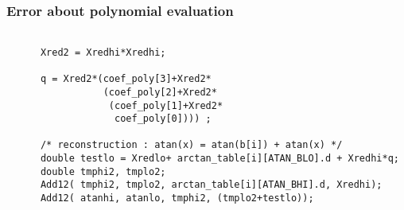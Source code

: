 \subsubsection{Error about polynomial evaluation}
\begin{lstlisting}[caption={Polynomial Evaluation},firstnumber=1]

      Xred2 = Xredhi*Xredhi;
      
      q = Xred2*(coef_poly[3]+Xred2*
                 (coef_poly[2]+Xred2*
                  (coef_poly[1]+Xred2*
                   coef_poly[0]))) ;

      /* reconstruction : atan(x) = atan(b[i]) + atan(x) */
      double testlo = Xredlo+ arctan_table[i][ATAN_BLO].d + Xredhi*q;
      double tmphi2, tmplo2;
      Add12( tmphi2, tmplo2, arctan_table[i][ATAN_BHI].d, Xredhi);
      Add12( atanhi, atanlo, tmphi2, (tmplo2+testlo));

\end{lstlisting}
